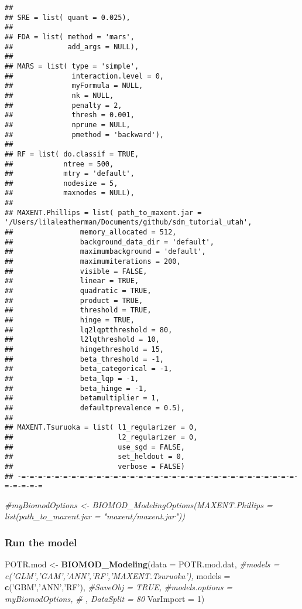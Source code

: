 \documentclass[]{article}
\newenvironment{Shaded}{\begin{snugshade}}{\end{snugshade}}
\newcommand{\KeywordTok}[1]{\textcolor[rgb]{0.13,0.29,0.53}{\textbf{#1}}}
\newcommand{\DataTypeTok}[1]{\textcolor[rgb]{0.13,0.29,0.53}{#1}}
\newcommand{\DecValTok}[1]{\textcolor[rgb]{0.00,0.00,0.81}{#1}}
\newcommand{\StringTok}[1]{\textcolor[rgb]{0.31,0.60,0.02}{#1}}
\newcommand{\CommentTok}[1]{\textcolor[rgb]{0.56,0.35,0.01}{\textit{#1}}}
\newcommand{\NormalTok}[1]{#1}
\begin{document}
\begin{verbatim}
## 
## SRE = list( quant = 0.025),
## 
## FDA = list( method = 'mars',
##             add_args = NULL),
## 
## MARS = list( type = 'simple',
##              interaction.level = 0,
##              myFormula = NULL,
##              nk = NULL,
##              penalty = 2,
##              thresh = 0.001,
##              nprune = NULL,
##              pmethod = 'backward'),
## 
## RF = list( do.classif = TRUE,
##            ntree = 500,
##            mtry = 'default',
##            nodesize = 5,
##            maxnodes = NULL),
## 
## MAXENT.Phillips = list( path_to_maxent.jar = '/Users/lilaleatherman/Documents/github/sdm_tutorial_utah',
##                memory_allocated = 512,
##                background_data_dir = 'default',
##                maximumbackground = 'default',
##                maximumiterations = 200,
##                visible = FALSE,
##                linear = TRUE,
##                quadratic = TRUE,
##                product = TRUE,
##                threshold = TRUE,
##                hinge = TRUE,
##                lq2lqptthreshold = 80,
##                l2lqthreshold = 10,
##                hingethreshold = 15,
##                beta_threshold = -1,
##                beta_categorical = -1,
##                beta_lqp = -1,
##                beta_hinge = -1,
##                betamultiplier = 1,
##                defaultprevalence = 0.5),
## 
## MAXENT.Tsuruoka = list( l1_regularizer = 0,
##                         l2_regularizer = 0,
##                         use_sgd = FALSE,
##                         set_heldout = 0,
##                         verbose = FALSE)
## -=-=-=-=-=-=-=-=-=-=-=-=-=-=-=-=-=-=-=-=-=-=-=-=-=-=-=-=-=-=-=-=-=-=-=-=-=-=
\end{verbatim}

\begin{Shaded}
\begin{Highlighting}[]
\CommentTok{#myBiomodOptions <- BIOMOD_ModelingOptions(MAXENT.Phillips = list(path_to_maxent.jar = "maxent/maxent.jar"))}
\end{Highlighting}
\end{Shaded}

\subsubsection{Run the model}\label{run-the-model}

\begin{Shaded}
\begin{Highlighting}[]
\NormalTok{POTR.mod <-}\StringTok{ }\KeywordTok{BIOMOD_Modeling}\NormalTok{(}\DataTypeTok{data =}\NormalTok{ POTR.mod.dat, }
                            \CommentTok{#models = c('GLM','GAM','ANN','RF','MAXENT.Tsuruoka'),  }
                            \DataTypeTok{models =} \KeywordTok{c}\NormalTok{(}\StringTok{'GBM'}\NormalTok{,}\StringTok{'ANN'}\NormalTok{,}\StringTok{'RF'}\NormalTok{), }
                            \CommentTok{#SaveObj = TRUE,}
                            \CommentTok{#models.options = myBiomodOptions,}
                            \CommentTok{# , DataSplit = 80}
                            \DataTypeTok{VarImport =} \DecValTok{1}\NormalTok{)}
\end{Highlighting}
\end{Shaded}
\end{document}
